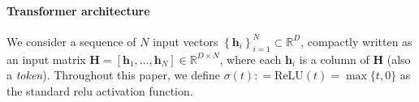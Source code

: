 \documentclass[10pt]{article}
\newcommand{\<}{\left\langle}
\renewcommand{\>}{\right\rangle}
\newcommand{\relu}{\mathrm{ReLU}}
\newcommand{\set}[1]{{\left\{ #1 \right\}}}
\newcommand{\sets}[1]{{\{ #1 \}}}
\newcommand{\defeq}{\mathrel{\mathop:}=}
\newcommand{\R}{\mathbb{R}}
\def\bH{{\mathbf H}}
\def\bh{{\mathbf h}}
\begin{document}
\paragraph{Transformer architecture} We consider a sequence of $N$ input vectors $\set{\bh_i}_{i=1}^N\subset \R^D$, compactly written as an input matrix $\bH=[\bh_1,\dots,\bh_N]\in \R^{D\times N}$, where each $\bh_i$ is a column of $\bH$ (also a \emph{token}). Throughout this paper, we define $\sigma(t)\defeq \relu(t)=\max\sets{t,0}$ as the standard relu activation function.
\end{document}
